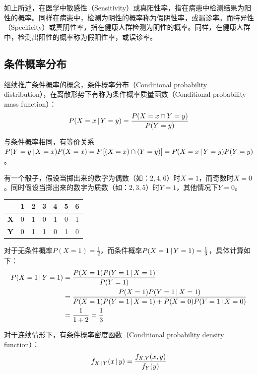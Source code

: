 \documentclass[11pt]{article}
\begin{document}
\begin{example}
\begin{remark}
        如上所述，在医学中敏感性（Sensitivity）或真阳性率，指在病患中检测结果为阳性的概率。同样在病患中，检测为阴性的概率称为假阴性率，或漏诊率。而特异性（Specificity）或真阴性率，指在健康人群检测为阴性的概率。同样，在健康人群中，检测出阳性的概率称为假阳性率，或误诊率。
    \end{remark}
\end{example}

\subsection{条件概率分布}

继续推广条件概率的概念，条件概率分布（Conditional probability distribution），在离散形势下有称为条件概率质量函数（Conditional probability mass function）：
\begin{equation*}
    P(X=x\,\vert\, Y=y) = \frac{P(X=x\cap Y=y)}{P(Y=y)}
\end{equation*}

与条件概率相同，有等价关系$P(Y=y\,\vert\, X=x)P(X=x) = P\left[(X=x)\cap (Y=y)\right] = P(X=x\,\vert\, Y=y)P(Y=y)$。

\begin{example}
    有一个骰子，假设当掷出来的数字为偶数（如：$2,4,6$）时$X=1$，而奇数时$X=0$。同时假设当掷出来的数字为质数（如：$2,3,5$）时$Y=1$，其他情况下$Y=0$。
    \begin{table}[H]
    \centering
    \begin{tabular}{@{}ccccccc@{}}
    \toprule
    & \textbf{1} & \textbf{2} & \textbf{3} & \textbf{4} & \textbf{5} & \textbf{6} \\ \midrule
    \textbf{X} & 0 & 1 & 0 & 1 & 0 & 1 \\
    \textbf{Y} & 0 & 1 & 1 & 0 & 1 & 0 \\ \bottomrule
    \end{tabular}
    \end{table}
    
    对于无条件概率$P(X=1) = \frac{1}{2}$，而条件概率$P(X=1\,\vert\, Y=1) = \frac{1}{3}$，具体计算如下：
    \begin{align*}
        P(X=1\,\vert\, Y=1) &= \frac{P(X=1)P(Y=1\,\vert\, X=1)}{P(Y=1)} \\
        &= \frac{P(X=1)P(Y=1\,\vert\, X=1)}{P(X=1)P(Y=1\,\vert\, X=1) + P(X=0)P(Y=1\,\vert\, X=0)} \\
        &= \frac{1}{1+2} = \frac{1}{3}
    \end{align*}
\end{example}

对于连续情形下，有条件概率密度函数（Conditional probability density function）：
\begin{equation*}
    f_{X\,\vert\, Y}(x\,\vert\, y) = \frac{f_{X,Y}(x,y)}{f_Y(y)}
\end{equation*}
\end{document}
